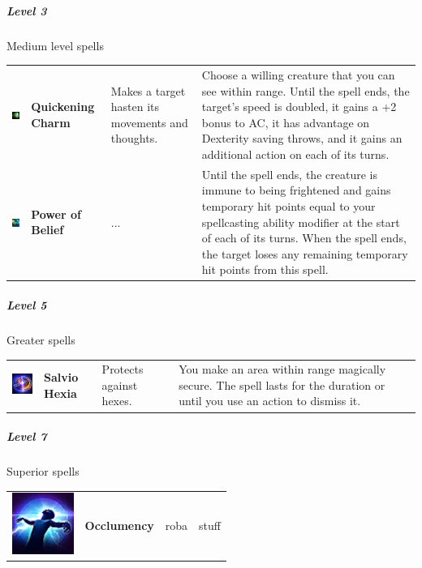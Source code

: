 \subparagraph{Level 3} 
Medium level spells \\
\begin{tabular}{ m{2cm}m{3cm}m{4cm}m{6cm} } 
	\includegraphics[width=2cm]{../Pictures/Gameplay/Spells/Icon/Haste_spell_icon.png} & \textbf{Quickening Charm} & Makes a target hasten its movements and thoughts. & Choose a willing creature that you can see within range. Until the spell ends, the target's speed is doubled, it gains a +2 bonus to AC, it has advantage on Dexterity saving throws, and it gains an additional action on each of its turns. \\ 
   \includegraphics[width=2cm]{../Pictures/Gameplay/Spells/Icon/Heroism_spell_icon.png} & \textbf{Power of Belief } & ... & Until the spell ends, the creature is immune to being frightened and gains temporary hit points equal to your spellcasting ability modifier at the start of each of its turns. When the spell ends, the target loses any remaining temporary hit points from this spell. \\  %
\end{tabular}

\subparagraph{Level 5} 
Greater spells \\
\begin{tabular}{ m{2cm}m{3cm}m{4cm}m{6cm} } 
	\includegraphics[width=2cm]{../Pictures/Gameplay/Spells/Icon/Salvio_Hexia_spell_icon.png} & \textbf{Salvio Hexia} &  Protects against hexes. & You make an area within range magically secure. The spell lasts for the duration or until you use an action to dismiss it.\\ 
\end{tabular}

\subparagraph{Level 7} 
Superior spells \\
\begin{tabular}{ m{2cm}m{3cm}m{4cm}m{6cm} } 
	\includegraphics[width=2cm]{../Pictures/Gameplay/Spells/Icon/Occlumency_spell_icon.png} & \textbf{Occlumency} & roba & stuff \\ %
\end{tabular}

